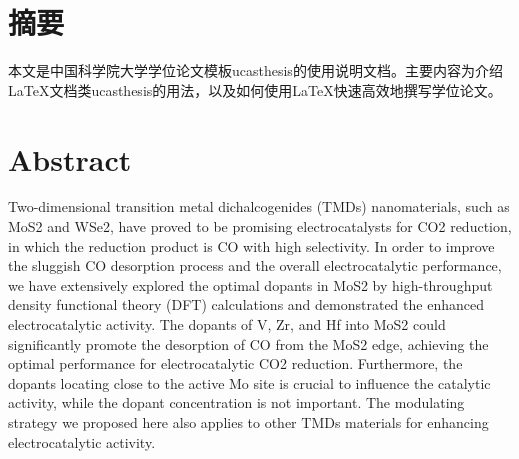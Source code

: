 \maketitle%
\MAKETITLE%
\makedeclaration%
\intobmk\chapter*{摘\quad 要}%
\setcounter{page}{1}%

本文是中国科学院大学学位论文模板ucasthesis的使用说明文档。主要内容为介绍\LaTeX{}文档类ucasthesis的用法，以及如何使用\LaTeX{}快速高效地撰写学位论文。

\intobmk\chapter*{Abstract}%

Two-dimensional transition metal dichalcogenides (TMDs) nanomaterials, such as MoS2 and WSe2, have proved to be promising electrocatalysts for CO2 reduction, in which the reduction product is CO with high selectivity. In order to improve the sluggish CO desorption process and the overall electrocatalytic performance, we have extensively explored the optimal dopants in MoS2 by high-throughput density functional theory (DFT) calculations and demonstrated the enhanced electrocatalytic activity. The dopants of V, Zr, and Hf into MoS2 could significantly promote the desorption of CO from the MoS2 edge, achieving the optimal performance for electrocatalytic CO2 reduction. Furthermore, the dopants locating close to the active Mo site is crucial to influence the catalytic activity, while the dopant concentration is not important. The modulating strategy we proposed here also applies to other TMDs materials for enhancing electrocatalytic activity.

